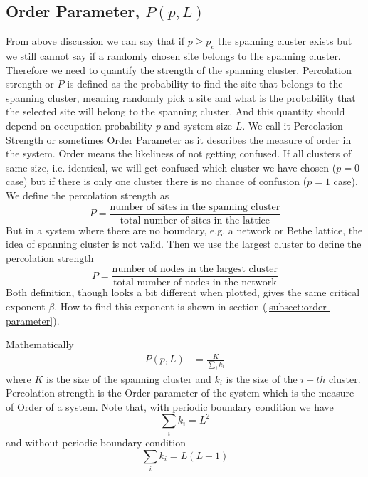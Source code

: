 	\subsection{Order Parameter, $P(p,L)$}
		From above discussion we can say that if $p\geq p_c$ the spanning cluster exists but we still cannot say if a randomly chosen site belongs to the spanning cluster. Therefore we need to quantify the strength of the spanning cluster. Percolation strength or $P$ is defined as the probability to find the site that belongs to the spanning cluster, meaning randomly pick a site and what is the probability that the selected site will belong to the spanning cluster. And this quantity should depend on occupation probability $p$ and system size $L$. We call it Percolation Strength or sometimes Order Parameter as it describes the measure of order in the system. Order means the likeliness of not getting confused. If all clusters of same size, i.e. identical, we will get confused which cluster we have chosen ($p=0$ case) but if there is only one cluster there is no chance of confusion ($p=1$ case).\\
		We define the percolation strength as
		\begin{equation}
			P = \frac{\text{number of sites in the spanning cluster}}{\text{total number of sites in the lattice}}
		\end{equation}
		But in a system where there are no boundary, e.g. a network or Bethe lattice, the idea of spanning cluster is not valid. Then we use the largest cluster to define the percolation strength
		\begin{equation}
			P = \frac{\text{number of nodes in the largest cluster}}{\text{total number of nodes in the network}}
		\end{equation}
		Both definition, though looks a bit different when plotted, gives the same critical exponent $\beta$. How to find this exponent is shown in section (\ref{subsect:order-parameter}).
		
	    Mathematically
		\begin{align}
			P(p,L) &= \frac{K}{\sum_{i} k_i}
			\label{def:order-parameter}
		\end{align}
		where $K$ is the size of the spanning cluster and $k_i$ is the size of the $i-th$ cluster.
		Percolation strength is the Order parameter of the system which is the measure of Order of a system.
		Note that, with periodic boundary condition we have
		\begin{equation}
			\sum_{i} k_i = L^2
		\end{equation}
		and without periodic boundary condition
		\begin{equation}
			\sum_{i} k_i = L(L-1)
		\end{equation}
		
